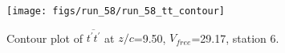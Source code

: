 \begin{figure}[H]
\centering
\texttt{[image: figs/run\_58/run\_58\_tt\_contour]}
\caption{Contour plot of $\overline{t^\prime t^\prime}$ at $z/c$=9.50, $V_{free}$=29.17, station 6.}
\label{fig:run_58_tt_contour}
\end{figure}


